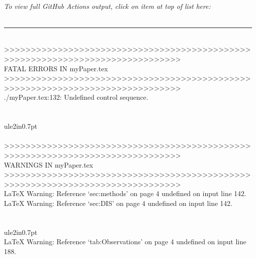\documentclass{article}
\begin{document}
\\
\noindent\emph{To view full GitHub Actions output, click on item at top of list here:}\\
\\
\noindent\rule{7in}{0.7pt}\\
\noindent >>>>>>>>>>>>>>>>>>>>>>>>>>>>>>>>>>>>>>>>>>>>>>>>>>>>>>>>>>>>>>>>>>>>>>>>>>>>>>> \\
\noindent               FATAL ERRORS IN myPaper.tex \\
\noindent >>>>>>>>>>>>>>>>>>>>>>>>>>>>>>>>>>>>>>>>>>>>>>>>>>>>>>>>>>>>>>>>>>>>>>>>>>>>>>> \\
\noindent ./myPaper.tex:132: Undefined control sequence. \\
\\
\\
\noindent 
ule{2in}{0.7pt} \\
\noindent   \\
\noindent >>>>>>>>>>>>>>>>>>>>>>>>>>>>>>>>>>>>>>>>>>>>>>>>>>>>>>>>>>>>>>>>>>>>>>>>>>>>>>> \\
\noindent               WARNINGS IN myPaper.tex \\
\noindent >>>>>>>>>>>>>>>>>>>>>>>>>>>>>>>>>>>>>>>>>>>>>>>>>>>>>>>>>>>>>>>>>>>>>>>>>>>>>>> \\
\noindent LaTeX Warning: Reference `sec:methods' on page 4 undefined on input line 142. \\
\noindent LaTeX Warning: Reference `sec:DIS' on page 4 undefined on input line 142. \\
\\
\\
\noindent 
ule{2in}{0.7pt} \\
\noindent LaTeX Warning: Reference `tab:Observations' on page 4 undefined on input line 188. \\
\\
\end{document}
